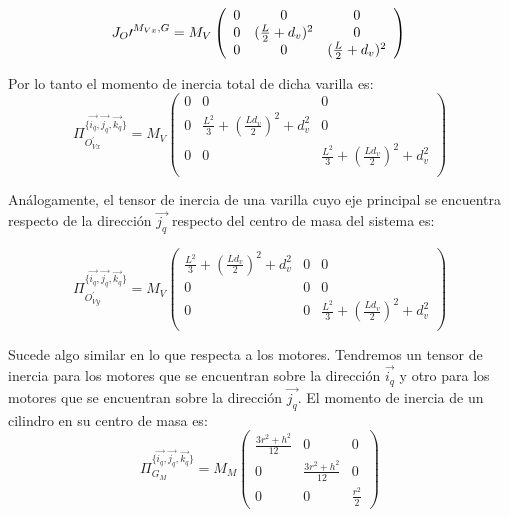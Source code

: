 \documentclass[main]{subfiles}
\begin{document}
\begin{equation}
J_O\prime^{M_{Vx},G}= M_V \left(\begin{array}{ccc}
0  &0&  0\\
0  & (\frac{L}{2}+d_v)^2 & 0\\
0  &0 & (\frac{L}{2}+d_v)^2  \\
\end{array}\right) \\
\end{equation}

Por lo tanto el momento de inercia total de dicha varilla es:
\begin{equation}
\Pi_{O^{\prime}_{Vx}}^{\{\vec{i_q}, \vec{j_q}, \vec{k_q}\}}=M_V \left(\begin{array}{ccc}
0  &0&  0\\
0  &\frac{L^2}{3}+(\frac{Ld_v}{2})^2+d_v^2 & 0\\
0  &0 & \frac{L^2}{3}+(\frac{Ld_v}{2})^2+d_v^2  \\
\end{array}\right)\end{equation}


Análogamente, el tensor de inercia de una varilla cuyo eje principal se encuentra respecto de la dirección $\vec{j_q}$ respecto del centro de masa del sistema es:

\begin{equation}
\Pi_{O^{\prime}_{Vy}}^{\{\vec{i_q}, \vec{j_q}, \vec{k_q}\}}=M_V \left(\begin{array}{ccc}
\frac{L^2}{3}+(\frac{Ld_v}{2})^2+d_v^2  &0 & 0\\
0  &0 & 0\\
0  &0 & \frac{L^2}{3}+(\frac{Ld_v}{2})^2+d_v^2  \\
\end{array}\right)\end{equation}


Sucede algo similar en lo que respecta a los motores. Tendremos un tensor de inercia para los motores que se encuentran sobre la dirección $\vec{i_q}$ y otro para los motores que se encuentran sobre la dirección $\vec{j_q}$. El momento de inercia de un cilindro en su centro de masa es:\\
\begin{equation}
\label{eq:izzm}
\Pi_{G_{M}}^{\{\vec{i_q}, \vec{j_q}, \vec{k_q}\}}=M_M\left(\begin{array}{ccc}
\frac{3r^2+h^2}{12}  &0&  0\\
0  &\frac{3r^2+h^2}{12} & 0\\
0  &0 & \frac{r^2}{2}  
\end{array}\right)
\end{equation}
\end{document}
